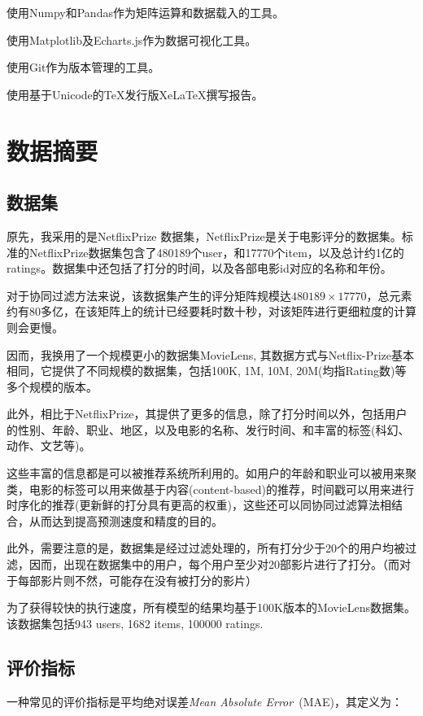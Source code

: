 \documentclass[utf8, a4paper, 11pt, onecolumn]{ctexart}
\begin{document}
\begin{spacing}{1.3}
使用Numpy和Pandas作为矩阵运算和数据载入的工具。

使用Matplotlib及Echarts.js作为数据可视化工具。

使用Git作为版本管理的工具。

使用基于Unicode的TeX发行版XeLaTeX撰写报告。

\section{数据摘要}

\subsection{数据集}

原先，我采用的是NetflixPrize 数据集，NetflixPrize是关于电影评分的数据集。标准的NetflixPrize数据集包含了480189个user，和17770个item，以及总计约1亿的ratings。数据集中还包括了打分的时间，以及各部电影id对应的名称和年份。

对于协同过滤方法来说，该数据集产生的评分矩阵规模达$480189 \times 17770$，总元素约有80多亿，在该矩阵上的统计已经要耗时数十秒，对该矩阵进行更细粒度的计算则会更慢。

因而，我换用了一个规模更小的数据集MovieLens, 其数据方式与Netflix-Prize基本相同，它提供了不同规模的数据集，包括100K, 1M, 10M, 20M(均指Rating数)等多个规模的版本。

此外，相比于NetflixPrize，其提供了更多的信息，除了打分时间以外，包括用户的性别、年龄、职业、地区，以及电影的名称、发行时间、和丰富的标签(科幻、动作、文艺等)。

这些丰富的信息都是可以被推荐系统所利用的。如用户的年龄和职业可以被用来聚类，电影的标签可以用来做基于内容(content-based)的推荐，时间戳可以用来进行时序化的推荐(更新鲜的打分具有更高的权重)，这些还可以同协同过滤算法相结合，从而达到提高预测速度和精度的目的。

此外，需要注意的是，数据集是经过过滤处理的，所有打分少于20个的用户均被过滤，因而，出现在数据集中的用户，每个用户至少对20部影片进行了打分。（而对于每部影片则不然，可能存在没有被打分的影片）

为了获得较快的执行速度，所有模型的结果均基于100K版本的MovieLens数据集。该数据集包括943 users, 1682 items, 100000 ratings.

\subsection{评价指标}
\label{评价指标}

一种常见的评价指标是平均绝对误差\textit{Mean Absolute Error}\ (MAE)，其定义为：


\end{spacing}
\end{document}
